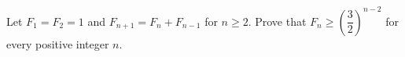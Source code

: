 Let $F_1=F_2=1$ and $F_{n+1}=F_n+F_{n-1}$ for $n\ge2$. Prove that $F_n\ge\left(\dfrac{3}{2}\right)^{n-2}$ for every positive integer $n$.
